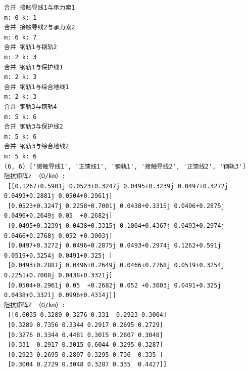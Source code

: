 \documentclass[11pt]{article}
\begin{document}
    \begin{Verbatim}[commandchars=\\\{\}]
合并 接触导线1与承力索1
m: 0 k: 1
合并 接触导线2与承力索2
m: 6 k: 7
合并 钢轨1与钢轨2
m: 2 k: 3
合并 钢轨1与保护线1
m: 2 k: 3
合并 钢轨1与综合地线1
m: 2 k: 3
合并 钢轨3与钢轨4
m: 5 k: 6
合并 钢轨3与保护线2
m: 5 k: 6
合并 钢轨3与综合地线2
m: 5 k: 6
(6, 6) ['接触导线1', '正馈线1', '钢轨1', '接触导线2', '正馈线2', '钢轨3']
阻抗矩阵z （Ω/km）: 
 [[0.1267+0.5901j 0.0523+0.3247j 0.0495+0.3239j 0.0497+0.3272j 0.0493+0.2881j 0.0504+0.2961j]
 [0.0523+0.3247j 0.2258+0.7001j 0.0438+0.3315j 0.0496+0.2875j 0.0496+0.2649j 0.05  +0.2682j]
 [0.0495+0.3239j 0.0438+0.3315j 0.1004+0.4367j 0.0493+0.2974j 0.0466+0.2768j 0.052 +0.3003j]
 [0.0497+0.3272j 0.0496+0.2875j 0.0493+0.2974j 0.1262+0.591j  0.0519+0.3254j 0.0491+0.325j ]
 [0.0493+0.2881j 0.0496+0.2649j 0.0466+0.2768j 0.0519+0.3254j 0.2251+0.7008j 0.0438+0.3321j]
 [0.0504+0.2961j 0.05  +0.2682j 0.052 +0.3003j 0.0491+0.325j  0.0438+0.3321j 0.0996+0.4314j]]
阻抗矩阵Z （Ω/km）: 
 [[0.6035 0.3289 0.3276 0.331  0.2923 0.3004]
 [0.3289 0.7356 0.3344 0.2917 0.2695 0.2729]
 [0.3276 0.3344 0.4481 0.3015 0.2807 0.3048]
 [0.331  0.2917 0.3015 0.6044 0.3295 0.3287]
 [0.2923 0.2695 0.2807 0.3295 0.736  0.335 ]
 [0.3004 0.2729 0.3048 0.3287 0.335  0.4427]]

    \end{Verbatim}
\end{document}

